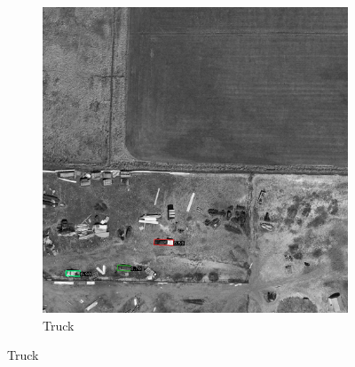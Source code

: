 \begin{figure}[h!]
\begin{subfigure}[t]{0.38\textwidth}
        \includegraphics[width=\linewidth]{images/015Results/03ablation/comp_images/blue/212.png}
        \caption{Truck}
    \end{subfigure}
    

\end{figure}
